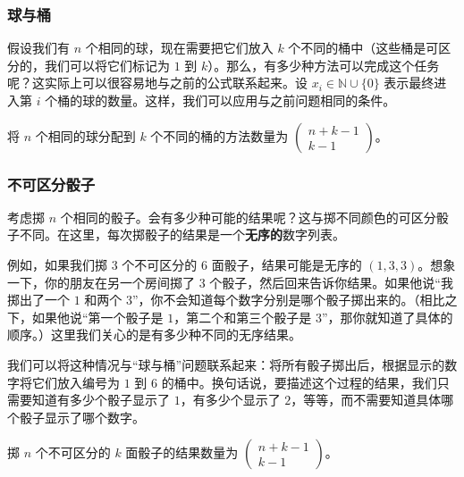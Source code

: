 \subsubsection*{球与桶}

假设我们有 $n$ 个相同的球，现在需要把它们放入 $k$ 个不同的桶中（这些桶是可区分的，我们可以将它们标记为 $1$ 到 $k$）。那么，有多少种方法可以完成这个任务呢？这实际上可以很容易地与之前的公式联系起来。设 $x_i \in \mathbb{N} \cup \{0\}$ 表示最终进入第 $i$ 个桶的球的数量。这样，我们可以应用与之前问题相同的条件。

\begin{tcolorbox}[colback=blue!10,
    colframe=blue,
    width=\textwidth,
    arc=2mm, auto outer arc,
    breakable,enhanced jigsaw,
    before upper={\parindent15pt\noindent},	]
    将 $n$ 个相同的球分配到 $k$ 个不同的桶的方法数量为 $\begin{pmatrix}
        n+k-1\\k-1
    \end{pmatrix}$。
\end{tcolorbox}

\subsubsection*{不可区分骰子}

考虑掷 $n$ 个相同的骰子。会有多少种可能的结果呢？这与掷不同颜色的可区分骰子不同。在这里，每次掷骰子的结果是一个\textbf{无序的}数字列表。

例如，如果我们掷 $3$ 个不可区分的 $6$ 面骰子，结果可能是无序的 $(1, 3, 3)$。想象一下，你的朋友在另一个房间掷了 $3$ 个骰子，然后回来告诉你结果。如果他说``我掷出了一个 $1$ 和两个 $3$''，你不会知道每个数字分别是哪个骰子掷出来的。（相比之下，如果他说``第一个骰子是 $1$，第二个和第三个骰子是 $3$''，那你就知道了具体的顺序。）这里我们关心的是有多少种不同的无序结果。

我们可以将这种情况与``球与桶''问题联系起来：将所有骰子掷出后，根据显示的数字将它们放入编号为 $1$ 到 $6$ 的桶中。换句话说，要描述这个过程的结果，我们只需要知道有多少个骰子显示了 $1$，有多少个显示了 $2$，等等，而不需要知道具体哪个骰子显示了哪个数字。

\begin{tcolorbox}[colback=blue!10,
    colframe=blue,
    width=\textwidth,
    arc=2mm, auto outer arc,
    breakable,enhanced jigsaw,
    before upper={\parindent15pt\noindent},	]
    掷 $n$ 个不可区分的 $k$ 面骰子的结果数量为 $\begin{pmatrix}
        n+k-1\\k-1
    \end{pmatrix}$。
\end{tcolorbox}